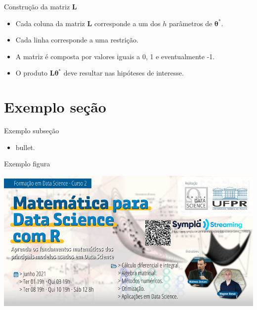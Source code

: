 \documentclass[
  ignorenonframetext,
  serif,
  professionalfont,
  usenames,
  dvipsnames,
  aspectratio = 169]{beamer}
\providecommand{\tightlist}{%
  \setlength{\itemsep}{0pt}\setlength{\parskip}{0pt}}
\renewcommand{\tightlist}{%
  \setlength{\itemsep}{0\baselineskip}
  \setlength{\parskip}{0.25\baselineskip}
}
\begin{document}
\begin{frame}{Construção da matriz \(\boldsymbol{L}\)}
\protect\hypertarget{construuxe7uxe3o-da-matriz-boldsymboll}{}
\begin{itemize}
  \itemsep 2ex
  
  \item Cada coluna da matriz $\boldsymbol{L}$ corresponde a um dos $h$ parâmetros de $\boldsymbol{\theta^{*}}$. 
  
  \item Cada linha corresponde a uma restrição. 

  \item A matriz é composta por valores iguais a 0, 1 e eventualmente -1.
  
  \item O produto $\boldsymbol{L}\boldsymbol{\theta^{*}}$ deve resultar nas hipóteses de interesse.

\end{itemize}
\end{frame}

\hypertarget{exemplo-seuxe7uxe3o}{%
\section{Exemplo seção}\label{exemplo-seuxe7uxe3o}}

\begin{frame}{Exemplo subseção}
\protect\hypertarget{exemplo-subseuxe7uxe3o}{}
\begin{itemize}
\tightlist
\item
  bullet.
\end{itemize}
\end{frame}

\begin{frame}{Exemplo figura}
\protect\hypertarget{exemplo-figura}{}
\begin{center}\includegraphics[width=0.8\linewidth]{./img/Cursos} \end{center}
\end{frame}
\end{document}
